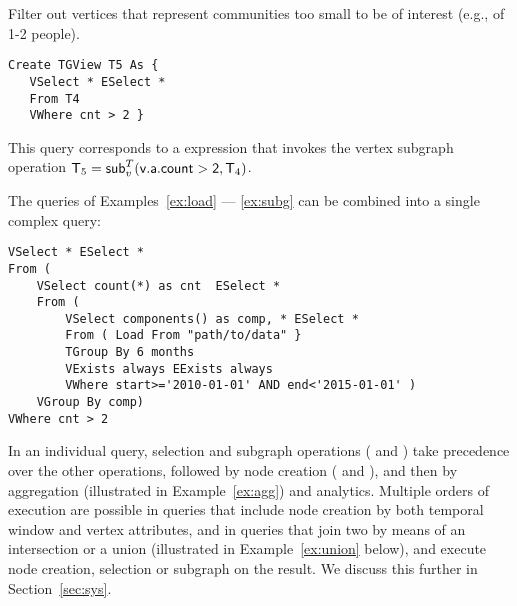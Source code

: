 
\begin{example}
\label{ex:subg}

Filter out vertices that represent communities too small to be of
interest (e.g., of 1-2 people).  

\begin{small} 
\begin{verbatim}
Create TGView T5 As {
   VSelect * ESelect *
   From T4
   VWhere cnt > 2 }
\end{verbatim}
\end{small}

This query corresponds to a \tra expression that invokes the vertex
subgraph operation $\mathsf{T}_5 = \textsf{sub}^T_v(\mathsf{v.a.count > 2},\mathsf{T}_4)$.

\end{example}

The queries of Examples~\ref{ex:load} --- \ref{ex:subg} can be
combined into a single complex query:

\begin{small}
\begin{verbatim}
VSelect * ESelect *
From (
    VSelect count(*) as cnt  ESelect *
    From (
        VSelect components() as comp, * ESelect *
        From ( Load From "path/to/data" }
        TGroup By 6 months
        VExists always EExists always
        VWhere start>='2010-01-01' AND end<'2015-01-01' )
    VGroup By comp)
VWhere cnt > 2 
\end{verbatim}
\end{small}

In an individual \ql query, selection and subgraph operations
( and ) take precedence over the other
operations, followed by node creation ( and
), and then by aggregation (illustrated in
Example~\ref{ex:agg}) and analytics.  Multiple orders of execution are
possible in queries that include node creation by both temporal window
and vertex attributes, and in queries that join two \tgs by means of
an intersection or a union (illustrated in Example~\ref{ex:union}
below), and execute node creation, selection or subgraph on the
result.  We discuss this further in Section~\ref{sec:sys}.



